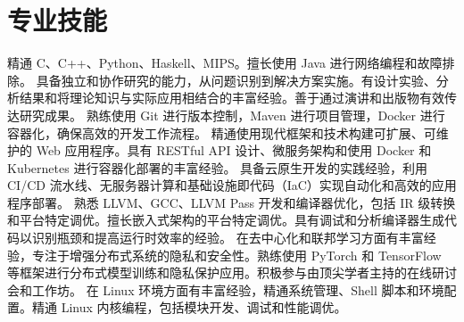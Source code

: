 \section{专业技能}
  \resumeSubHeadingListStart
      {精通 C、C++、Python、Haskell、MIPS。擅长使用 Java 进行网络编程和故障排除。}
      {具备独立和协作研究的能力，从问题识别到解决方案实施。有设计实验、分析结果和将理论知识与实际应用相结合的丰富经验。善于通过演讲和出版物有效传达研究成果。}
      {熟练使用 Git 进行版本控制，Maven 进行项目管理，Docker 进行容器化，确保高效的开发工作流程。}
      {精通使用现代框架和技术构建可扩展、可维护的 Web 应用程序。具有 RESTful API 设计、微服务架构和使用 Docker 和 Kubernetes 进行容器化部署的丰富经验。}
      {具备云原生开发的实践经验，利用 CI/CD 流水线、无服务器计算和基础设施即代码（IaC）实现自动化和高效的应用程序部署。}
      {熟悉 LLVM、GCC、LLVM Pass 开发和编译器优化，包括 IR 级转换和平台特定调优。擅长嵌入式架构的平台特定调优。具有调试和分析编译器生成代码以识别瓶颈和提高运行时效率的经验。}
      {在去中心化和联邦学习方面有丰富经验，专注于增强分布式系统的隐私和安全性。熟练使用 PyTorch 和 TensorFlow 等框架进行分布式模型训练和隐私保护应用。积极参与由顶尖学者主持的在线研讨会和工作坊。}
      {在 Linux 环境方面有丰富经验，精通系统管理、Shell 脚本和环境配置。精通 Linux 内核编程，包括模块开发、调试和性能调优。}
  \resumeSubHeadingListEnd